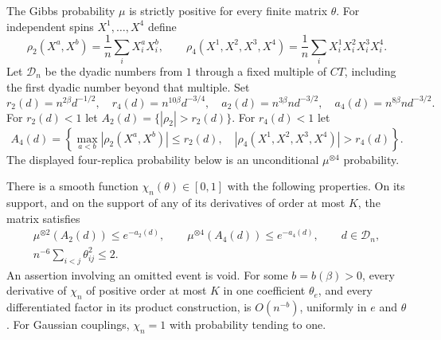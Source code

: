 The Gibbs probability $\mu$ is strictly positive for every finite matrix
$\theta$.  For independent spins
$X^1,\ldots,X^4$ define
\[
 \rho_2(X^a,X^b)=\frac1n\sum_iX_i^aX_i^b,
 \qquad
 \rho_4(X^1,X^2,X^3,X^4)=\frac1n\sum_iX_i^1X_i^2X_i^3X_i^4.
\]
Let $\mathscr D_n$ be the dyadic numbers from $1$ through a fixed multiple
of $CT$, including the first dyadic number beyond that multiple.  Set
\begin{equation}\label{hist:static-scales}
 r_2(d)=n^{2\beta}d^{-1/2},\quad r_4(d)=n^{10\beta}d^{-3/4},\quad
 a_2(d)=n^{3\beta}nd^{-3/2},\quad a_4(d)=n^{8\beta}nd^{-3/2}.
\end{equation}
For $r_2(d)<1$ let $A_2(d)=\{|\rho_2|>r_2(d)\}$.  For $r_4(d)<1$ let
\[
 A_4(d)=\left\{\max_{a<b}|\rho_2(X^a,X^b)|\le r_2(d),\quad
                    |\rho_4(X^1,X^2,X^3,X^4)|>r_4(d)\right\}.
\]
The displayed four-replica probability below is an unconditional
$\mu^{\otimes4}$ probability.

\begin{lemma}\label{hist:static-support}
There is a smooth function $\chi_n(\theta)\in[0,1]$ with the following
properties.  On its support, and on the support of any of its derivatives
of order at most $K$, the matrix satisfies
\begin{equation}\label{hist:static-conditions}
 \begin{gathered}
 \mu^{\otimes2}(A_2(d))\le e^{-a_2(d)},\qquad
 \mu^{\otimes4}(A_4(d))\le e^{-a_4(d)},\qquad d\in\mathscr D_n,\\
 n^{-6}\sum_{i<j}\theta_{ij}^2\le2.
 \end{gathered}
\end{equation}
An assertion involving an omitted event is void.  For some $b=b(\beta)>0$,
every derivative of $\chi_n$ of positive order at most $K$ in one coefficient
$\theta_e$, and every differentiated factor in its product construction,
is $O(n^{-b})$, uniformly in $e$ and $\theta$.  For Gaussian couplings,
$\chi_n=1$ with probability tending to one.
\end{lemma}

